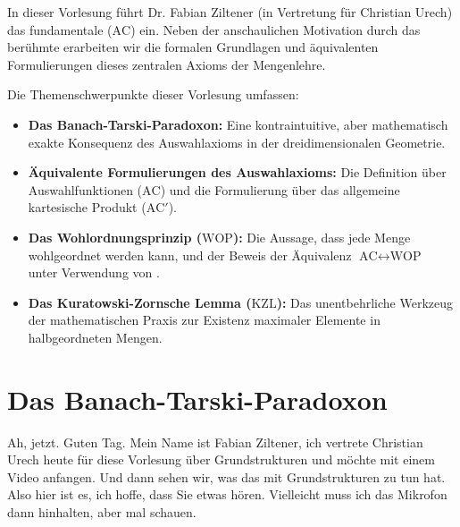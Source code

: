 

\begin{nice-box}
In dieser Vorlesung führt Dr. Fabian Ziltener (in Vertretung für Christian Urech) das fundamentale  ($\text{AC}$) ein. Neben der anschaulichen Motivation durch das berühmte  erarbeiten wir die formalen Grundlagen und äquivalenten Formulierungen dieses zentralen Axioms der Mengenlehre.

Die Themenschwerpunkte dieser Vorlesung umfassen:
\begin{itemize}
    \item \textbf{Das Banach-Tarski-Paradoxon:} Eine kontraintuitive, aber mathematisch exakte Konsequenz des Auswahlaxioms in der dreidimensionalen Geometrie.
    \item \textbf{Äquivalente Formulierungen des Auswahlaxioms:} Die Definition über Auswahlfunktionen ($\text{AC}$) und die Formulierung über das allgemeine kartesische Produkt ($\text{AC}'$).
    \item \textbf{Das Wohlordnungsprinzip ($\text{WOP}$):} Die Aussage, dass jede Menge wohlgeordnet werden kann, und der Beweis der Äquivalenz $\text{AC} \leftrightarrow \text{WOP}$ unter Verwendung von .
    \item \textbf{Das Kuratowski-Zornsche Lemma ($\text{KZL}$):} Das unentbehrliche Werkzeug der mathematischen Praxis zur Existenz maximaler Elemente in halbgeordneten Mengen.
\end{itemize}
\end{nice-box}

\section{Das Banach-Tarski-Paradoxon}

\begin{spoken-clean}[00:00:00 - 00:01:46]
Ah, jetzt. Guten Tag. Mein Name ist Fabian Ziltener, ich vertrete Christian Urech heute für diese Vorlesung über Grundstrukturen und möchte mit einem Video anfangen. Und dann sehen wir, was das mit Grundstrukturen zu tun hat. Also hier ist es, ich hoffe, dass Sie etwas hören. Vielleicht muss ich das Mikrofon dann hinhalten, aber mal schauen.

\end{spoken-clean}

